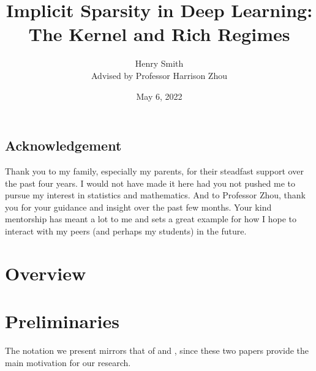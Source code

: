\documentclass{article}
\title{\textbf{Implicit Sparsity in Deep Learning:\\The Kernel and Rich Regimes}}
\author[]{Henry Smith\\
Advised by Professor Harrison Zhou}
\affil[]{\normalsize Department of Statistics \& Data Science\\Yale University}
\date{May 6, 2022}
\begin{document}
\maketitle

\begin{abstract}

\end{abstract}

\pagebreak

\vspace*{\fill}

\begin{centering}
\section*{Acknowledgement}
Thank you to my family, especially my parents, for their steadfast support over the past four years. I would not have made it here had you not pushed me to pursue my interest in statistics and mathematics. And to Professor Zhou, thank you for your guidance and insight over the past few months. Your kind mentorship has meant a lot to me and sets a great example for how I hope to interact with my peers (and perhaps my students) in the future. 
\end{centering}

\vspace*{\fill}

\pagebreak

\vspace*{\fill}

\begin{centering}
\tableofcontents
\end{centering}

\vspace*{\fill}

\pagebreak

\section{Overview}

\section{Preliminaries}\label{preliminaries}

The notation we present mirrors that of \cite{chizat2018lazy} and \cite{woodworth2020kernel}, since these two papers provide the main motivation for our research.
\end{document}
